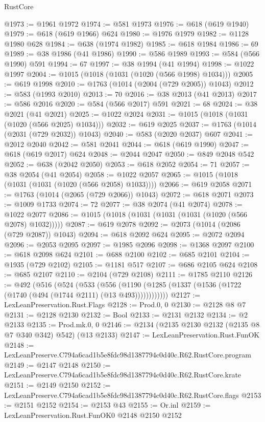 \begin{lexlean}{RustCore}
\begin{coremodule}
@1973 := @1961 @1972
@1974 := @581 @1973
@1976 := @618 (@619 @1940)
@1979 := @618 (@619 @1966) @624
@1980 := @1976 @1979
@1982 := @1128 @1980 @628
@1984 := @638 (@1974 @1982)
@1985 := @618 @1984
@1986 := 69
@1989 := @38 @1986 (@41 @1986)
@1990 := @586 @1989
@1993 := @584 (@566 @1990) @591
@1994 := 67
@1997 := @38 @1994 (@41 @1994)
@1998 := @1022 @1997
@2004 := @1015 (@1018 (@1031 (@1020 (@566 @1998) @1034)))
@2005 := @619 @1998
@2010 := @1763 (@1014 (@2004 (@729 @2005)) @1043)
@2012 := @583 (@1993 @2010)
@2013 := 70
@2016 := @38 @2013 (@41 @2013)
@2017 := @586 @2016
@2020 := @584 (@566 @2017) @591
@2021 := 68
@2024 := @38 @2021 (@41 @2021)
@2025 := @1022 @2024
@2031 := @1015 (@1018 (@1031 (@1020 (@566 @2025) @1034)))
@2032 := @619 @2025
@2037 := @1763 (@1014 (@2031 (@729 @2032)) @1043)
@2040 := @583 (@2020 @2037) @607
@2041 := @2012 @2040
@2042 := @581 @2041
@2044 := @618 (@619 @1990)
@2047 := @618 (@619 @2017) @624
@2048 := @2044 @2047
@2050 := @849 @2048 @542
@2052 := @638 (@2042 @2050)
@2053 := @618 @2052
@2054 := 71
@2057 := @38 @2054 (@41 @2054)
@2058 := @1022 @2057
@2065 := @1015 (@1018 (@1031 (@1031 (@1020 (@566 @2058) @1033))))
@2066 := @619 @2058
@2071 := @1763 (@1014 (@2065 (@729 @2066)) @1043)
@2072 := @618 @2071
@2073 := @1009 @1733
@2074 := 72
@2077 := @38 @2074 (@41 @2074)
@2078 := @1022 @2077
@2086 := @1015 (@1018 (@1031 (@1031 (@1031 (@1020 (@566 @2078) @1032)))))
@2087 := @619 @2078
@2092 := @2073 (@1014 (@2086 (@729 @2087)) @1043)
@2094 := @618 @2092 @624
@2095 := @2072 @2094
@2096 := @2053 @2095
@2097 := @1985 @2096
@2098 := @1368 @2097
@2100 := @618 @2098 @624
@2101 := @688 @2100
@2102 := @685 @2101
@2104 := @1935 (@729 @2102)
@2105 := @1181 @517
@2107 := @686 @2105 @624
@2108 := @685 @2107
@2110 := @2104 (@729 @2108)
@2111 := @1785 @2110
@2126 := @492
    (@516
      (@524
        (@533
          (@556 (@1190 (@1285 (@1337 (@1536 (@1722 (@1740 (@494 (@1744 @2111) (@13 @493))))))))))))
@2127 := LexLeanPreservation.Rust.Flags
@2128 := Prod.{0, 0}
@2130 := @2128 @8 @7
@2131 := @2128 @2130
@2132 := Bool
@2133 := @2131 @2132
@2134 := @2 @2133
@2135 := Prod.mk.{0, 0}
@2146 := @2134 (@2135 @2130 @2132 (@2135 @8 @7 @340 @342) @542) (@13 @2133)
@2147 := LexLeanPreservation.Rust.FunOK
@2148 := LexLeanPreserve.C794a6cad1b5e8fdc98d1387794c0d40c.R62.RustCore.program
@2149 := @2147 @2148
@2150 := LexLeanPreserve.C794a6cad1b5e8fdc98d1387794c0d40c.R62.RustCore.krate
@2151 := @2149 @2150
@2152 := LexLeanPreserve.C794a6cad1b5e8fdc98d1387794c0d40c.R62.RustCore.flags
@2153 := @2151 @2152
@2154 := @2153 @43
@2155 := Or.inl
@2159 := LexLeanPreservation.Rust.FunOK0 @2148 @2150 @2152

\end{coremodule}
\end{lexlean}
